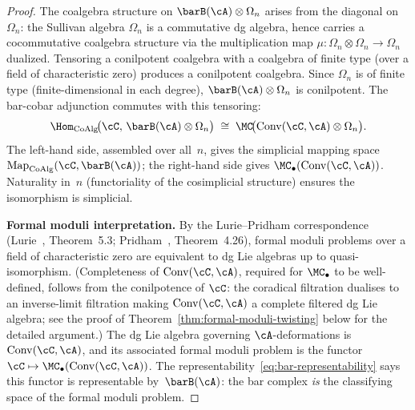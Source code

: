 \begin{proof}
The coalgebra structure on $\barB(\cA) \otimes \Omega_n$ arises from the diagonal on $\Omega_n$: the Sullivan algebra $\Omega_n$ is a commutative dg algebra, hence carries a cocommutative coalgebra structure via the multiplication map $\mu: \Omega_n \otimes \Omega_n \to \Omega_n$ dualized. Tensoring a conilpotent coalgebra with a coalgebra of finite type (over a field of characteristic zero) produces a conilpotent coalgebra. Since $\Omega_n$ is of finite type (finite-dimensional in each degree), $\barB(\cA) \otimes \Omega_n$ is conilpotent.
The bar-cobar adjunction commutes with this
tensoring:
\[
\Hom_{\mathrm{CoAlg}}\!\bigl(\cC,\,
 \barB(\cA) \otimes \Omega_n\bigr)
\;\cong\;
\MC\!\bigl(\mathrm{Conv}(\cC, \cA) \otimes \Omega_n\bigr).
\]
The left-hand side, assembled over all~$n$, gives the simplicial
mapping space
$\mathrm{Map}_{\mathrm{CoAlg}}(\cC, \barB(\cA))$;
the right-hand side gives
$\MC_\bullet(\mathrm{Conv}(\cC, \cA))$.
Naturality in~$n$ (functoriality of the cosimplicial structure)
ensures the isomorphism is simplicial.

\medskip\noindent
\textbf{Formal moduli interpretation.}
By the Lurie--Pridham correspondence
(Lurie~\cite{Lur11}, Theorem~5.3;
Pridham~\cite{Pri10}, Theorem~4.26),
formal moduli problems over a field of characteristic zero are
equivalent to dg Lie algebras up to quasi-isomorphism.
(Completeness of $\mathrm{Conv}(\cC, \cA)$, required for $\MC_\bullet$ to be well-defined, follows from the conilpotence of $\cC$: the coradical filtration dualises to an inverse-limit filtration making $\mathrm{Conv}(\cC, \cA)$ a complete filtered dg Lie algebra; see the proof of Theorem~\ref{thm:formal-moduli-twisting} below for the detailed argument.)
The dg
Lie algebra governing $\cA$-deformations is
$\mathrm{Conv}(\cC, \cA)$, and its associated formal moduli
problem is the functor
$\cC \mapsto \MC_\bullet(\mathrm{Conv}(\cC, \cA))$.
The representability~\eqref{eq:bar-representability} says this
functor is representable by~$\barB(\cA)$: the bar complex
\emph{is} the classifying space of the formal moduli problem.
\end{proof}

